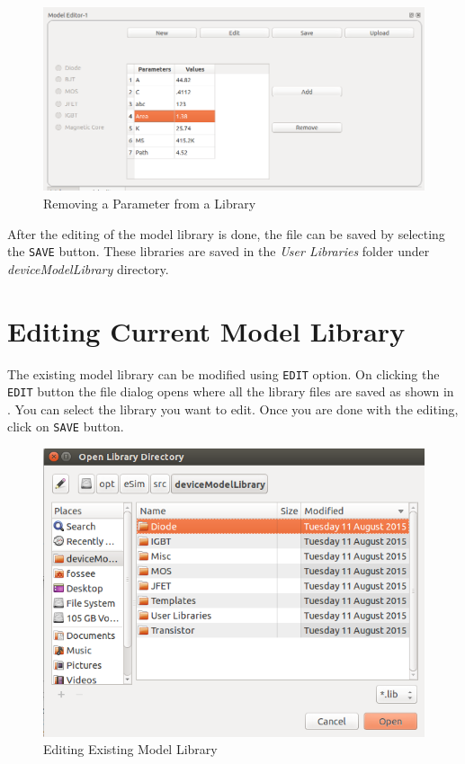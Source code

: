 \begin{figure}
\centering
\includegraphics[width =\lgfig]{modelremove.png}
\caption{Removing a Parameter from a Library }
\label{modelremove}
\end{figure}

After the editing of the model library is done, the file can be saved by selecting the {\tt SAVE} button. These libraries are saved in the \textit{User Libraries} folder under \textit{deviceModelLibrary} directory.

\section{Editing Current Model Library}
The existing model library can be modified using {\tt EDIT} option. On clicking the {\tt EDIT} button the file dialog opens where all the library files are saved as shown in . You can select the library you want to edit.
Once you are done with the editing, click on {\tt SAVE} button.

\begin{figure}
\centering
\includegraphics[width =\lgfig]{modeledit.png}
\caption{Editing Existing Model Library}
\label{modeledit}
\end{figure}

